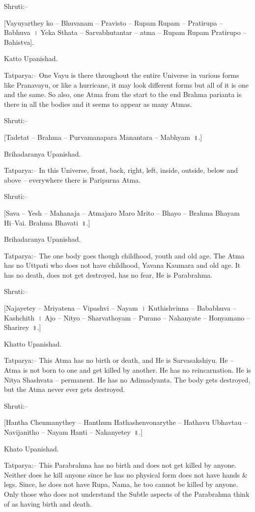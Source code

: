 Shruti:–

[Vayuyarthey ko – Bhuvanam – Pravisto – Rupam Rupam – Pratirupa – Babhuva~। Yeka Sthata – Sarvabhutantar – atma – Rupam Rupam Pratirupo – Bahistva].

Katto Upanishad.

Tatparya:– One Vayu is there throughout the entire Universe in various forms like Pranavayu, or like a hurricane, it may look different forms but all of it is one and the same. So also, one Atma from the start to the end Brahma parianta is there in all the bodies and it seems to appear as many Atmas.

Shruti:–

[Tadetat – Brahma – Purvamanapara Manantara – Mabhyam~॥.]

Brihadaranya Upanishad.

Tatparya:– In this Universe, front, back, right, left, inside, outside, below and above – everywhere there is Paripurna Atma.

Shruti:–

[Sava – Yesh – Mahanaja – Atmajaro Maro Mrito – Bhayo – Brahma Bhayam Hi–Vai. Brahma Bhavati~॥.]

Brihadaranya Upanishad.

Tatparya:– The one body goes though childhood, youth and old age. The Atma has no Uttpati who does not have childhood, Yavana Kaumara and old age. It has no death, does not get destroyed, has no fear, He is Parabrahma.

Shruti:–

[Najayetey – Mriyatena – Vipashvi – Nayam~। Kuthishvinna – Bababhuva – Kashchith~। Ajo – Nityo – Sharvathoyam – Purano – Nahanyate – Honyamano – Sharirey~॥.]

Khatto Upanishad.

Tatparya:– This Atma has no birth or death, and He is Sarvasakshiyu. He – Atma is not born to one and get killed by another. He has no reincarnation. He is Nitya Shashvata – permanent. He has no Adimadyanta. The body gets destroyed, but the Atma never ever gets destroyed.

Shruti:–

[Hantha Chenmanythey – Hanthum Hathashenvonarythe – Hathavu Ubhavtau – Navijanitho – Nayam Hanti – Nahanyetey~॥.]

Khato Upanishad.

Tatparya:– This Parabrahma has no birth and does not get killed by anyone. Neither does he kill anyone since he has no physical form does not have hands \& legs. Since, he does not have Rupa, Nama, he too cannot be killed by anyone. Only those who does not understand the Subtle aspects of the Parabrahma think of as having birth and death.

